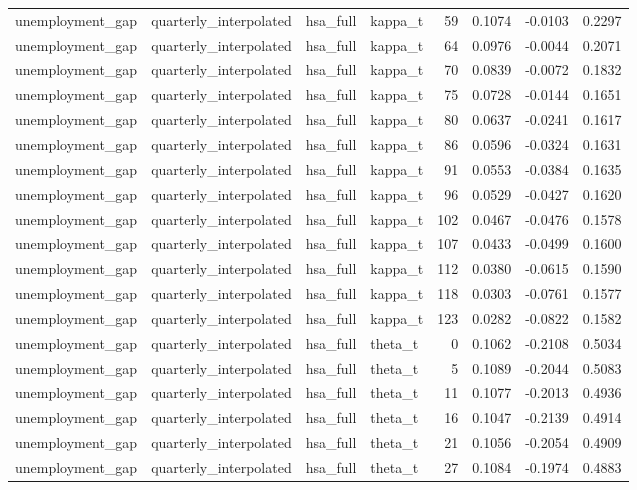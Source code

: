 \begin{tabular}{llllrrrr}
unemployment\_gap & quarterly\_interpolated & hsa\_full & kappa\_t & 59 & 0.1074 & -0.0103 & 0.2297 \\
unemployment\_gap & quarterly\_interpolated & hsa\_full & kappa\_t & 64 & 0.0976 & -0.0044 & 0.2071 \\
unemployment\_gap & quarterly\_interpolated & hsa\_full & kappa\_t & 70 & 0.0839 & -0.0072 & 0.1832 \\
unemployment\_gap & quarterly\_interpolated & hsa\_full & kappa\_t & 75 & 0.0728 & -0.0144 & 0.1651 \\
unemployment\_gap & quarterly\_interpolated & hsa\_full & kappa\_t & 80 & 0.0637 & -0.0241 & 0.1617 \\
unemployment\_gap & quarterly\_interpolated & hsa\_full & kappa\_t & 86 & 0.0596 & -0.0324 & 0.1631 \\
unemployment\_gap & quarterly\_interpolated & hsa\_full & kappa\_t & 91 & 0.0553 & -0.0384 & 0.1635 \\
unemployment\_gap & quarterly\_interpolated & hsa\_full & kappa\_t & 96 & 0.0529 & -0.0427 & 0.1620 \\
unemployment\_gap & quarterly\_interpolated & hsa\_full & kappa\_t & 102 & 0.0467 & -0.0476 & 0.1578 \\
unemployment\_gap & quarterly\_interpolated & hsa\_full & kappa\_t & 107 & 0.0433 & -0.0499 & 0.1600 \\
unemployment\_gap & quarterly\_interpolated & hsa\_full & kappa\_t & 112 & 0.0380 & -0.0615 & 0.1590 \\
unemployment\_gap & quarterly\_interpolated & hsa\_full & kappa\_t & 118 & 0.0303 & -0.0761 & 0.1577 \\
unemployment\_gap & quarterly\_interpolated & hsa\_full & kappa\_t & 123 & 0.0282 & -0.0822 & 0.1582 \\
unemployment\_gap & quarterly\_interpolated & hsa\_full & theta\_t & 0 & 0.1062 & -0.2108 & 0.5034 \\
unemployment\_gap & quarterly\_interpolated & hsa\_full & theta\_t & 5 & 0.1089 & -0.2044 & 0.5083 \\
unemployment\_gap & quarterly\_interpolated & hsa\_full & theta\_t & 11 & 0.1077 & -0.2013 & 0.4936 \\
unemployment\_gap & quarterly\_interpolated & hsa\_full & theta\_t & 16 & 0.1047 & -0.2139 & 0.4914 \\
unemployment\_gap & quarterly\_interpolated & hsa\_full & theta\_t & 21 & 0.1056 & -0.2054 & 0.4909 \\
unemployment\_gap & quarterly\_interpolated & hsa\_full & theta\_t & 27 & 0.1084 & -0.1974 & 0.4883 \\

\end{tabular}
